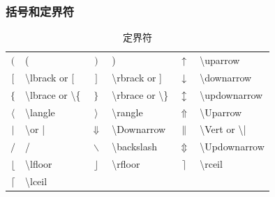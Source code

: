 \documentclass[a4paper]{ctexart}
\begin{document}
    \subsubsection{括号和定界符}
    \begin{table}[H]
        \centering
        \caption{定界符}
        \begin{tabular}{clclcl}
            \toprule
            $($                 & (                               & $)$                 & )                                 &
            $\uparrow$          & \textbackslash uparrow                                                                    \\
            $[$                 & \textbackslash lbrack or [      & $]$                 & \textbackslash rbrack or ]        &
            $\downarrow$        & \textbackslash downarrow                                                                  \\
            $\{$                & \textbackslash lbrace or \textbackslash\{                                                 & 
            $\}$                & \textbackslash rbrace or \textbackslash\}                                                 &
            $\updownarrow$      & \textbackslash updownarrow                                                                \\
            $\langle$           & \textbackslash langle           & $\rangle$           & \textbackslash rangle             &
            $\Uparrow$          & \textbackslash Uparrow                                                                    \\
            $\vert$             & \textbackslash or |             & $\Downarrow$        & \textbackslash Downarrow          &
            $\|$                & \textbackslash Vert or \textbackslash|                                                    \\
            $/$                 & /                               & $\backslash$        & \textbackslash backslash          &
            $\Updownarrow$      & \textbackslash Updownarrow                                                                \\
            $\lfloor$           & \textbackslash lfloor           & $\rfloor$           & \textbackslash rfloor             &
            $\rceil$            & \textbackslash rceil                                                                      \\
            $\lceil$            & \textbackslash lceil                                                                      \\
            \bottomrule
        \end{tabular}
    \end{table}
\end{document}
